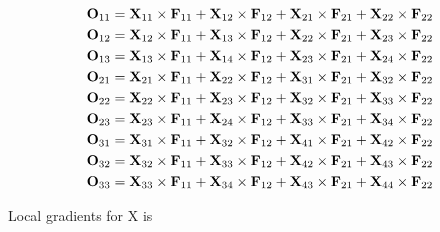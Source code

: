\begin{align}\label{eq:conv2d_fwd_output}
  \bold{O}_{11} & = \bold{X}_{11} \times \bold{F}_{11} + \bold{X}_{12} \times \bold{F}_{12}
                  + \bold{X}_{21} \times \bold{F}_{21} + \bold{X}_{22} \times \bold{F}_{22} \\
  \bold{O}_{12} & = \bold{X}_{12} \times \bold{F}_{11} + \bold{X}_{13} \times \bold{F}_{12}
                  + \bold{X}_{22} \times \bold{F}_{21} + \bold{X}_{23} \times \bold{F}_{22} \\
  \bold{O}_{13} & = \bold{X}_{13} \times \bold{F}_{11} + \bold{X}_{14} \times \bold{F}_{12}
                  + \bold{X}_{23} \times \bold{F}_{21} + \bold{X}_{24} \times \bold{F}_{22} \\
  \bold{O}_{21} & = \bold{X}_{21} \times \bold{F}_{11} + \bold{X}_{22} \times \bold{F}_{12}
                  + \bold{X}_{31} \times \bold{F}_{21} + \bold{X}_{32} \times \bold{F}_{22} \\
  \bold{O}_{22} & = \bold{X}_{22} \times \bold{F}_{11} + \bold{X}_{23} \times \bold{F}_{12}
                  + \bold{X}_{32} \times \bold{F}_{21} + \bold{X}_{33} \times \bold{F}_{22}\\
  \bold{O}_{23} & = \bold{X}_{23} \times \bold{F}_{11} + \bold{X}_{24} \times \bold{F}_{12}
                  + \bold{X}_{33} \times \bold{F}_{21} + \bold{X}_{34} \times \bold{F}_{22}\\
  \bold{O}_{31} & = \bold{X}_{31} \times \bold{F}_{11} + \bold{X}_{32} \times \bold{F}_{12}
                  + \bold{X}_{41} \times \bold{F}_{21} + \bold{X}_{42} \times \bold{F}_{22}\\
  \bold{O}_{32} & = \bold{X}_{32} \times \bold{F}_{11} + \bold{X}_{33} \times \bold{F}_{12}
                  + \bold{X}_{42} \times \bold{F}_{21} + \bold{X}_{43} \times \bold{F}_{22}\\
  \bold{O}_{33} & = \bold{X}_{33} \times \bold{F}_{11} + \bold{X}_{34} \times \bold{F}_{12}
                   + \bold{X}_{43} \times \bold{F}_{21} + \bold{X}_{44} \times \bold{F}_{22}
\end{align}

Local gradients for X is


